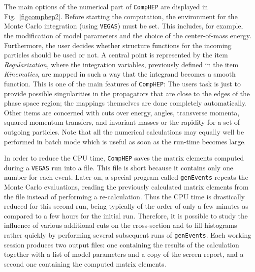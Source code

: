 The main options of the numerical part of {\tt CompHEP} are displayed in
Fig.~\ref{figcomphep2}.  Before starting the computation, the
environment for the Monte Carlo integration (using {\tt VEGAS}) must be
set.  This includes, for example, the modification of model parameters
and the choice of the center-of-mass energy. Furthermore, the user
decides whether structure functions for the incoming particles should be
used or not.  A central point is represented by the item {\it
  Regularization}, where the integration variables, previously defined
in the item {\it Kinematics}, are mapped in such a way that the
integrand becomes a smooth function.  This is one of the main features
of {\tt CompHEP}: The users task is just to provide possible
singularities in the propagators that are close to the edges of the
phase space region; the mappings themselves are done completely
automatically.  Other items are concerned with cuts over energy, angles,
transverse momenta, squared momentum transfers, and invariant masses or
the rapidity for a set of outgoing particles.  Note that all the
numerical calculations may equally well be performed in batch mode which
is useful as soon as the run-time becomes large.

In order to reduce the CPU time, {\tt CompHEP} saves the matrix elements
computed during a {\tt VEGAS} run into a file. This file is short
because it contains only one number for each event.  Later-on, a special
program called {\tt genEvents} repeats the Monte Carlo evaluations,
reading the previously calculated matrix elements from the file instead
of performing a re-calculation. Thus the CPU time is drastically reduced
for this second run, being typically of the order of only a few minutes
as compared to a few hours for the initial run.  Therefore, it is
possible to study the influence of various additional cuts on the
cross-section and to fill histograms rather quickly by performing
several subsequent runs of {\tt genEvents}.  Each working session
produces two output files: one containing the results of the calculation
together with a list of model parameters and a copy of the screen
report, and a second one containing the computed matrix elements.





